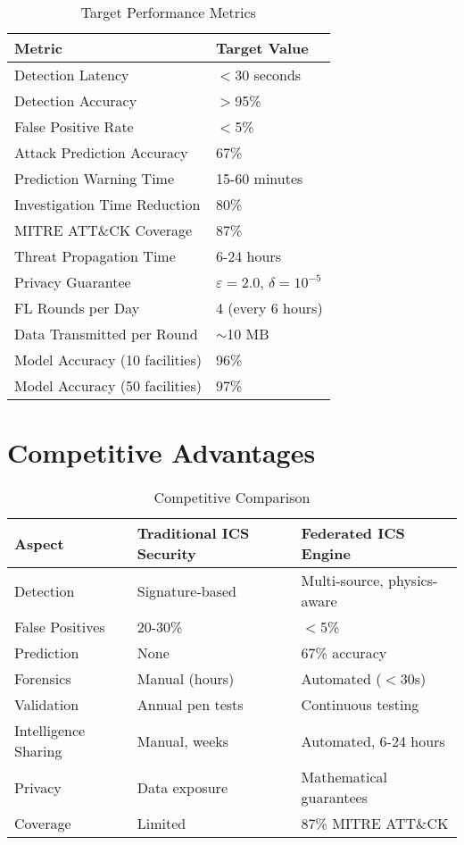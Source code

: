 \documentclass[11pt,a4paper]{article}
\begin{document}
\begin{table}[H]
\centering
\begin{tabular}{@{}ll@{}}
\toprule
\textbf{Metric} & \textbf{Target Value} \\ \midrule
Detection Latency & $<$30 seconds \\
Detection Accuracy & $>$95\% \\
False Positive Rate & $<$5\% \\
Attack Prediction Accuracy & 67\% \\
Prediction Warning Time & 15-60 minutes \\
Investigation Time Reduction & 80\% \\
MITRE ATT\&CK Coverage & 87\% \\
Threat Propagation Time & 6-24 hours \\
Privacy Guarantee & $\varepsilon=2.0$, $\delta=10^{-5}$ \\
FL Rounds per Day & 4 (every 6 hours) \\
Data Transmitted per Round & $\sim$10 MB \\
Model Accuracy (10 facilities) & 96\% \\
Model Accuracy (50 facilities) & 97\% \\ \bottomrule
\end{tabular}
\caption{Target Performance Metrics}
\end{table}

\section{Competitive Advantages}

\begin{table}[H]
\centering
\small
\begin{tabular}{@{}lll@{}}
\toprule
\textbf{Aspect} & \textbf{Traditional ICS Security} & \textbf{Federated ICS Engine} \\ \midrule
Detection & Signature-based & Multi-source, physics-aware \\
False Positives & 20-30\% & $<$5\% \\
Prediction & None & 67\% accuracy \\
Forensics & Manual (hours) & Automated ($<$30s) \\
Validation & Annual pen tests & Continuous testing \\
Intelligence Sharing & Manual, weeks & Automated, 6-24 hours \\
Privacy & Data exposure & Mathematical guarantees \\
Coverage & Limited & 87\% MITRE ATT\&CK \\ \bottomrule
\end{tabular}
\caption{Competitive Comparison}
\end{table}
\end{document}
